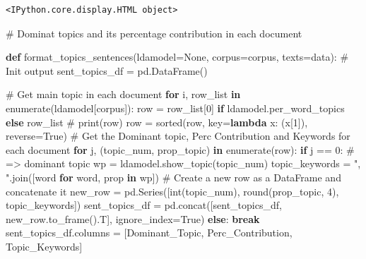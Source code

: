 \documentclass[
  letterpaper,
  DIV=11,
  numbers=noendperiod]{scrreprt}
\newenvironment{Shaded}{\begin{snugshade}}{\end{snugshade}}
\newcommand{\BuiltInTok}[1]{\textcolor[rgb]{0.00,0.23,0.31}{#1}}
\newcommand{\CommentTok}[1]{\textcolor[rgb]{0.37,0.37,0.37}{#1}}
\newcommand{\ControlFlowTok}[1]{\textcolor[rgb]{0.00,0.23,0.31}{\textbf{#1}}}
\newcommand{\DecValTok}[1]{\textcolor[rgb]{0.68,0.00,0.00}{#1}}
\newcommand{\KeywordTok}[1]{\textcolor[rgb]{0.00,0.23,0.31}{\textbf{#1}}}
\newcommand{\NormalTok}[1]{\textcolor[rgb]{0.00,0.23,0.31}{#1}}
\newcommand{\OperatorTok}[1]{\textcolor[rgb]{0.37,0.37,0.37}{#1}}
\newcommand{\StringTok}[1]{\textcolor[rgb]{0.13,0.47,0.30}{#1}}
\newcommand{\VariableTok}[1]{\textcolor[rgb]{0.07,0.07,0.07}{#1}}
\begin{document}
\begin{verbatim}
<IPython.core.display.HTML object>
\end{verbatim}

\begin{Shaded}
\begin{Highlighting}[]
\CommentTok{\# Dominat topics and its percentage contribution in each document}

\KeywordTok{def}\NormalTok{ format\_topics\_sentences(ldamodel}\OperatorTok{=}\VariableTok{None}\NormalTok{, corpus}\OperatorTok{=}\NormalTok{corpus, texts}\OperatorTok{=}\NormalTok{data):}
    \CommentTok{\# Init output}
\NormalTok{    sent\_topics\_df }\OperatorTok{=}\NormalTok{ pd.DataFrame()}

    \CommentTok{\# Get main topic in each document}
    \ControlFlowTok{for}\NormalTok{ i, row\_list }\KeywordTok{in} \BuiltInTok{enumerate}\NormalTok{(ldamodel[corpus]):}
\NormalTok{        row }\OperatorTok{=}\NormalTok{ row\_list[}\DecValTok{0}\NormalTok{] }\ControlFlowTok{if}\NormalTok{ ldamodel.per\_word\_topics }\ControlFlowTok{else}\NormalTok{ row\_list            }
        \CommentTok{\# print(row)}
\NormalTok{        row }\OperatorTok{=} \BuiltInTok{sorted}\NormalTok{(row, key}\OperatorTok{=}\KeywordTok{lambda}\NormalTok{ x: (x[}\DecValTok{1}\NormalTok{]), reverse}\OperatorTok{=}\VariableTok{True}\NormalTok{)}
        \CommentTok{\# Get the Dominant topic, Perc Contribution and Keywords for each document}
        \ControlFlowTok{for}\NormalTok{ j, (topic\_num, prop\_topic) }\KeywordTok{in} \BuiltInTok{enumerate}\NormalTok{(row):}
            \ControlFlowTok{if}\NormalTok{ j }\OperatorTok{==} \DecValTok{0}\NormalTok{:  }\CommentTok{\# =\textgreater{} dominant topic}
\NormalTok{                wp }\OperatorTok{=}\NormalTok{ ldamodel.show\_topic(topic\_num)}
\NormalTok{                topic\_keywords }\OperatorTok{=} \StringTok{", "}\NormalTok{.join([word }\ControlFlowTok{for}\NormalTok{ word, prop }\KeywordTok{in}\NormalTok{ wp])}
                \CommentTok{\# Create a new row as a DataFrame and concatenate it}
\NormalTok{                new\_row }\OperatorTok{=}\NormalTok{ pd.Series([}\BuiltInTok{int}\NormalTok{(topic\_num), }\BuiltInTok{round}\NormalTok{(prop\_topic, }\DecValTok{4}\NormalTok{), topic\_keywords])}
\NormalTok{                sent\_topics\_df }\OperatorTok{=}\NormalTok{ pd.concat([sent\_topics\_df, new\_row.to\_frame().T], ignore\_index}\OperatorTok{=}\VariableTok{True}\NormalTok{)}
            \ControlFlowTok{else}\NormalTok{:}
                \ControlFlowTok{break}
\NormalTok{    sent\_topics\_df.columns }\OperatorTok{=}\NormalTok{ [}\StringTok{\textquotesingle{}Dominant\_Topic\textquotesingle{}}\NormalTok{, }\StringTok{\textquotesingle{}Perc\_Contribution\textquotesingle{}}\NormalTok{, }\StringTok{\textquotesingle{}Topic\_Keywords\textquotesingle{}}\NormalTok{]}


\end{Highlighting}
\end{Shaded}
\end{document}
